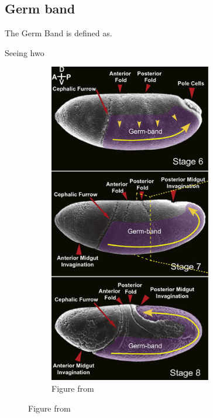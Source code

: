 \subsection{Germ band}
The Germ Band is defined as.

Seeing hwo 

\begin{figure}[H]
    \centering
    \begin{subfigure}[b]{0.25\textwidth}
        \includegraphics[width=\textwidth]{chapters/Results/figures/compareGB.png}
    \caption{Figure from\cite{kong2017forces} }
        

\end{subfigure}
\end{figure}
